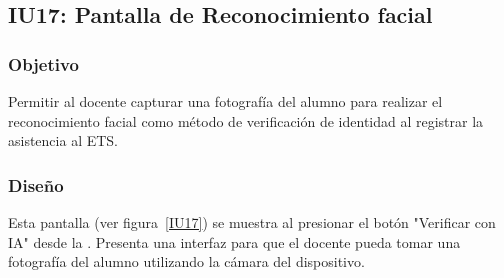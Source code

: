 \subsection{IU17: Pantalla de Reconocimiento facial}

\newpage

\subsubsection{Objetivo}
Permitir al docente capturar una fotografía del alumno para realizar el reconocimiento facial como método de verificación de identidad al registrar la asistencia al ETS.

\subsubsection{Diseño}
Esta pantalla  (ver figura~\ref{IU17}) se muestra al presionar el botón "Verificar con IA" desde la . Presenta una interfaz para que el docente pueda tomar una fotografía del alumno utilizando la cámara del dispositivo.



